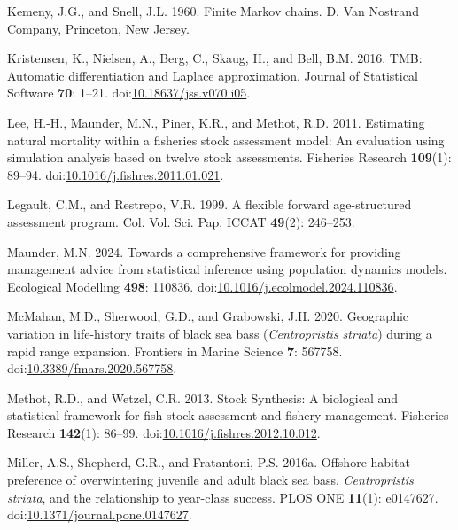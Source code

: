 \documentclass[
]{article}
\newlength{\cslhangindent}
\newlength{\cslentryspacingunit} %
\newenvironment{CSLReferences}[2] %
 {%
  \setlength{\parindent}{0pt}
  \ifodd #1
  \let\oldpar\par
  \def\par{\hangindent=\cslhangindent\oldpar}
  \fi
  \setlength{\parskip}{#2\cslentryspacingunit}
 }%
 {}
\begin{document}
\begin{CSLReferences}{1}{0}
\leavevmode{}%
Kemeny, J.G., and Snell, J.L. 1960. Finite {M}arkov chains. D. Van Nostrand Company, Princeton, New Jersey.

\leavevmode{}%
Kristensen, K., Nielsen, A., Berg, C., Skaug, H., and Bell, B.M. 2016. {TMB}: Automatic differentiation and {Laplace} approximation. Journal of Statistical Software \textbf{70}: 1--21. doi:\href{https://doi.org/10.18637/jss.v070.i05}{10.18637/jss.v070.i05}.

\leavevmode{}%
Lee, H.-H., Maunder, M.N., Piner, K.R., and Methot, R.D. 2011. Estimating natural mortality within a fisheries stock assessment model: An evaluation using simulation analysis based on twelve stock assessments. Fisheries Research \textbf{109}(1): 89--94. doi:\href{https://doi.org/10.1016/j.fishres.2011.01.021}{10.1016/j.fishres.2011.01.021}.

\leavevmode{}%
Legault, C.M., and Restrepo, V.R. 1999. A flexible forward age-structured assessment program. Col. Vol. Sci. Pap. ICCAT \textbf{49}(2): 246--253.

\leavevmode{}%
Maunder, M.N. 2024. Towards a comprehensive framework for providing management advice from statistical inference using population dynamics models. Ecological Modelling \textbf{498}: 110836. doi:\href{https://doi.org/10.1016/j.ecolmodel.2024.110836}{10.1016/j.ecolmodel.2024.110836}.

\leavevmode{}%
McMahan, M.D., Sherwood, G.D., and Grabowski, J.H. 2020. Geographic variation in life-history traits of black sea bass (\emph{{C}entropristis striata}) during a rapid range expansion. Frontiers in Marine Science \textbf{7}: 567758. doi:\href{https://doi.org/10.3389/fmars.2020.567758}{10.3389/fmars.2020.567758}.

\leavevmode{}%
Methot, R.D., and Wetzel, C.R. 2013. Stock {S}ynthesis: A biological and statistical framework for fish stock assessment and fishery management. Fisheries Research \textbf{142}(1): 86--99. doi:\href{https://doi.org/10.1016/j.fishres.2012.10.012}{10.1016/j.fishres.2012.10.012}.

\leavevmode{}%
Miller, A.S., Shepherd, G.R., and Fratantoni, P.S. 2016a. Offshore habitat preference of overwintering juvenile and adult black sea bass, \emph{{C}entropristis} \emph{striata}, and the relationship to year-class success. {PLOS} {ONE} \textbf{11}(1): e0147627. doi:\href{https://doi.org/10.1371/journal.pone.0147627}{10.1371/journal.pone.0147627}.


\end{CSLReferences}
\end{document}
